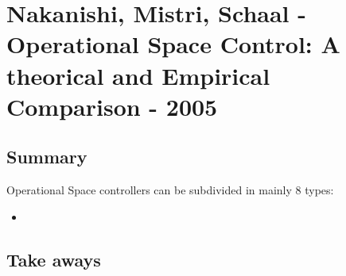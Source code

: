 \section{Nakanishi, Mistri, Schaal - Operational Space Control: A theorical and Empirical Comparison - 2005}

\subsection*{Summary}
Operational Space controllers can be subdivided in mainly 8 types:
\begin{itemize}
\item 
\end{itemize}
\subsection*{Take aways}